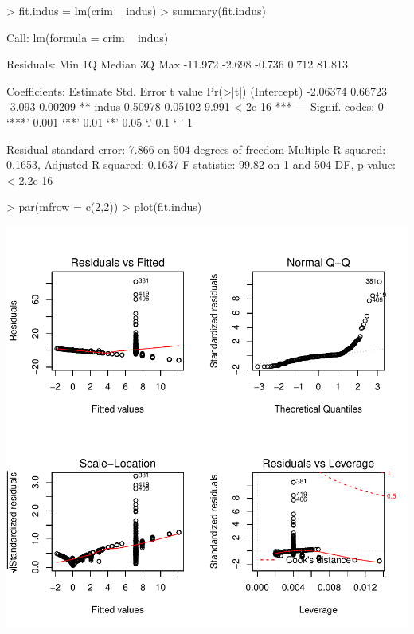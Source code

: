 \documentclass[a4paper]{article}
\begin{document}
\begin{Schunk}
\begin{Sinput}
> fit.indus = lm(crim ~ indus)
> summary(fit.indus)
\end{Sinput}
\begin{Soutput}
Call:
lm(formula = crim ~ indus)

Residuals:
    Min      1Q  Median      3Q     Max 
-11.972  -2.698  -0.736   0.712  81.813 

Coefficients:
            Estimate Std. Error t value Pr(>|t|)    
(Intercept) -2.06374    0.66723  -3.093  0.00209 ** 
indus        0.50978    0.05102   9.991  < 2e-16 ***
---
Signif. codes:  0 ‘***’ 0.001 ‘**’ 0.01 ‘*’ 0.05 ‘.’ 0.1 ‘ ’ 1

Residual standard error: 7.866 on 504 degrees of freedom
Multiple R-squared:  0.1653,	Adjusted R-squared:  0.1637 
F-statistic: 99.82 on 1 and 504 DF,  p-value: < 2.2e-16
\end{Soutput}
\begin{Sinput}
> par(mfrow = c(2,2))
> plot(fit.indus)
\end{Sinput}
\end{Schunk}
\includegraphics{mutivariblelm-indus}
\end{document}
